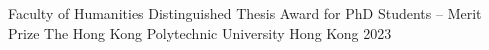 

\begin{cvhonors}

  \cvhonor
    {Faculty of Humanities Distinguished Thesis Award for PhD
    Students -- Merit Prize} %
    {The Hong Kong Polytechnic University} %
    {Hong Kong} %
    {2023} %
\end{cvhonors}




